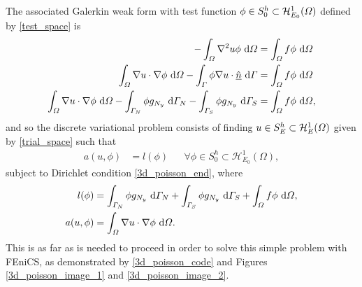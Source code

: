 The associated Galerkin weak form with test function $\phi \in S_0^h \subset \mathcal{H}_{E_0}^1(\varOmega)$ defined by \cref{test_space} is
{\footnotesize
\begin{align*}
  -\int_{\varOmega} \nabla^2 u \phi \ \mathrm{d}\varOmega &= \int_{\varOmega} f \phi \ \mathrm{d}\varOmega \\
  \int_{\varOmega} \nabla u \cdot \nabla \phi \ \mathrm{d}\varOmega - \int_{\varGamma} \phi \nabla u \cdot \underline{\hat{n}} \ \mathrm{d}\varGamma &= \int_{\varOmega} f \phi \ \mathrm{d}\varOmega \\
  \int_{\varOmega} \nabla u \cdot \nabla \phi \ \mathrm{d}\varOmega - \int_{\varGamma_N} \phi g_{N_y} \ \mathrm{d}\varGamma_N - \int_{\varGamma_S} \phi g_{N_y} \ \mathrm{d}\varGamma_S &= \int_{\varOmega} f \phi \ \mathrm{d}\varOmega,
\end{align*}}
and so the discrete variational problem consists of finding $u \in S_E^h \subset \mathcal{H}_E^1(\varOmega)$ given by \cref{trial_space} such that
\begin{align*}
  a(u,\phi) &= l(\phi) && \forall \phi \in S_0^h \subset \mathcal{H}_{E_0}^1(\Omega),
\end{align*}
subject to Dirichlet condition \cref{3d_poisson_end}, where
\begin{align*}
  l(\phi) &= \int_{\varGamma_N} \phi g_{N_y} \ \mathrm{d}\varGamma_N + \int_{\varGamma_S} \phi g_{N_y} \ \mathrm{d}\varGamma_S + \int_{\varOmega} f \phi \ \mathrm{d}\varOmega, \\
  a(u,\phi) &= \int_{\varOmega} \nabla u \cdot \nabla \phi \ \mathrm{d}\varOmega.
\end{align*}
This is as far as is needed to proceed in order to solve this simple problem with FEniCS, as demonstrated by \cref{3d_poisson_code} and Figures \cref{3d_poisson_image_1} and \cref{3d_poisson_image_2}.

  
